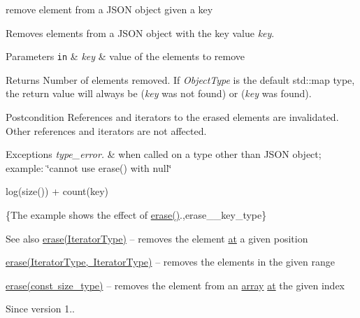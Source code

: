 remove element from a J\+S\+ON object given a key 

Removes elements from a J\+S\+ON object with the key value {\itshape key}.


\begin{DoxyParams}[1]{Parameters}
\mbox{\tt in}  & {\em key} & value of the elements to remove\\
\hline
\end{DoxyParams}
\begin{DoxyReturn}{Returns}
Number of elements removed. If {\itshape Object\+Type} is the default {\ttfamily std\+::map} type, the return value will always be {} ({\itshape key} was not found) or {} ({\itshape key} was found).
\end{DoxyReturn}
\begin{DoxyPostcond}{Postcondition}
References and iterators to the erased elements are invalidated. Other references and iterators are not affected.
\end{DoxyPostcond}

\begin{DoxyExceptions}{Exceptions}
{\em type\+\_\+error.} & when called on a type other than J\+S\+ON object; example\+: {\ttfamily \char`\"{}cannot use erase() with null\char`\"{}}\\
\hline
\end{DoxyExceptions}
{\ttfamily log(size()) + count(key)}

\{The example shows the effect of {\ttfamily \mbox{\hyperlink{classnlohmann_1_1basic__json_a068a16e76be178e83da6a192916923ed}{erase()}}}.,erase\+\_\+\+\_\+key\+\_\+type\}

\begin{DoxySeeAlso}{See also}
\mbox{\hyperlink{classnlohmann_1_1basic__json_a068a16e76be178e83da6a192916923ed}{erase(\+Iterator\+Type)}} -- removes the element \mbox{\hyperlink{classnlohmann_1_1basic__json_a73ae333487310e3302135189ce8ff5d8}{at}} a given position 

\mbox{\hyperlink{classnlohmann_1_1basic__json_a4b3f7eb2d4625d95a51fbbdceb7c5f39}{erase(\+Iterator\+Type, Iterator\+Type)}} -- removes the elements in the given range 

\mbox{\hyperlink{classnlohmann_1_1basic__json_a88cbcefe9a3f4d294bed0653550a5cb9}{erase(const size\+\_\+type)}} -- removes the element from an \mbox{\hyperlink{classnlohmann_1_1basic__json_a8a7d537fc297bbc5b845f92fe0445e3b}{array}} \mbox{\hyperlink{classnlohmann_1_1basic__json_a73ae333487310e3302135189ce8ff5d8}{at}} the given index
\end{DoxySeeAlso}
\begin{DoxySince}{Since}
version 1.. 
\end{DoxySince}
\mbox{\label{classnlohmann_1_1basic__json_a88cbcefe9a3f4d294bed0653550a5cb9}} 
